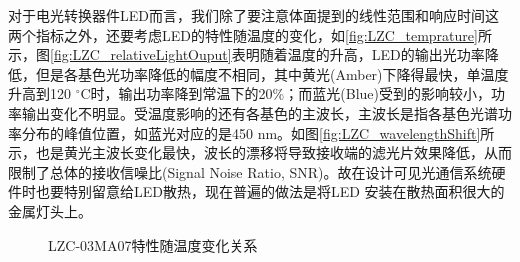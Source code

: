 对于电光转换器件LED而言，我们除了要注意体面提到的线性范围和响应时间这两个指标之外，还要考虑LED的特性随温度的变化，如\autoref{fig:LZC_temprature}所示\cite{LZC2013}，图\ref{fig:LZC_relativeLightOuput}表明随着温度的升高，LED的输出光功率降低，但是各基色光功率降低的幅度不相同，其中黄光(Amber)下降得最快，单温度升高到120 $^{\circ}$C时，输出功率降到常温下的20\%；而蓝光(Blue)受到的影响较小，功率输出变化不明显。受温度影响的还有各基色的主波长，主波长是指各基色光谱功率分布的峰值位置，如蓝光对应的是450 nm。如图\ref{fig:LZC_wavelengthShift}所示，也是黄光主波长变化最快，波长的漂移将导致接收端的滤光片效果降低，从而限制了总体的接收信噪比(Signal Noise Ratio, SNR)。故在设计可见光通信系统硬件时也要特别留意给LED散热，现在普遍的做法是将LED 安装在散热面积很大的金属灯头上。
\begin{figure}[h]
    \centering
    \caption{LZC-03MA07特性随温度变化关系}
    \label{fig:LZC_temprature}
\end{figure}


